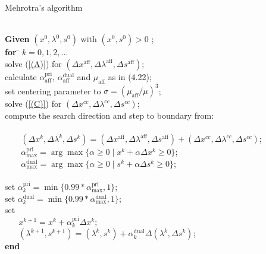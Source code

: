 \documentclass[a4paper,10 pt,titlepage,twoside]{book}
\theoremstyle{plain}
\theoremstyle{definition}
\theoremstyle{remark}
\begin{document}
\begin{algorithm}[H]\caption{Mehrotra's algorithm}
\begin{tabbing}
	\\
	\textbf{Given} $(x^{0}, \lambda^{0}, s^{0})$ with $(x^{0}, s^{0})> 0$ ; \\
	\textbf{for} \= $k = 0, 1, 2,...$ \\
	\> solve (\ref{(A)}) for $(\Delta x^{\text{aff}},\Delta \lambda^{\text{aff}},\Delta s^{\text{aff}})$;\\
	\> calculate $\alpha_{\text{aff}}^{\text{pri}}$, $\alpha_{\text{aff}}^{\text{dual}}$ and $\mu_{\text{aff}}$ as in (4.22);\\
	\> set centering parameter to $\sigma = (\mu_{\text{aff}}/\mu)^{3}$; \\
	\> solve (\ref{(C)}) for $(\Delta x^{cc},\Delta \lambda^{cc},\Delta s^{cc})$;\\
	\> compute the search direction and step to boundary from: \\
	\> \\
	\> $\;\;\;\;\;\;\;(\Delta x^{k},\Delta \lambda^{k},\Delta s^{k})=(\Delta x^{\text{aff}},\Delta \lambda^{\text{aff}},\Delta s^{\text{aff}})+(\Delta x^{cc},\Delta  \lambda^{cc},\Delta s^{cc})$;\\
	\> $\;\;\;\;\;\;\;\alpha_{\text{max}}^{\text{pri}}=\arg\max\{\alpha\geq0\;|\;x^{k} +\alpha\Delta x^{k}\geq 0\}$;\\
	\> $\;\;\;\;\;\;\;\alpha_{\text{max}}^{\text{dual}}=\arg\max\{\alpha\geq0\;|\;s^{k} +\alpha\Delta s^{k}\geq 0\}$;\\
	\>\\
	\> set $\alpha_{k}^{\text{pri}}=\min\{0.99\ast\alpha_{\text{max}}^{\text{pri}},1\}$;\\
	\> set $\alpha_{k}^{\text{dual}}=\min\{0.99\ast\alpha_{\text{max}}^{\text{dual}},1\}$;\\
	\> set\\
	\> $\;\;\;\;\;\;x^{k+1} = x^{k} + \alpha_{k}^{\text{pri}}\Delta x^{k}$;\\
	\>$\;\;\;\;\;\;(\lambda^{k+1},s^{k+1}) = (\lambda^{k},s^{k}) + \alpha_{k}^{\text{dual}}\Delta (\lambda^{k},\Delta s^{k})$;\\
\textbf{end}
\end{tabbing}
\end{algorithm}
\end{document}
